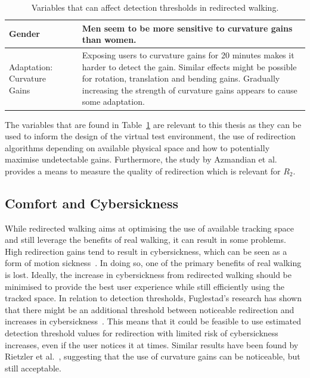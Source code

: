 \begin{table}[!h]
\begin{tabularx}{\textwidth}{|m{2cm}|m{1.7cm}|m{10.1cm}|}
\hline
Gender & \cite{nguyen2018individual} & Men seem to be more sensitive to curvature gains than women.\\
\hline
Adaptation: Curvature Gains & \cite{5072212, bolling2019shrinking, grechkin2016revisiting} & Exposing users to curvature gains for 20 minutes makes it harder to detect the gain. Similar effects might be possible for rotation, translation and bending gains. Gradually increasing the strength of curvature gains appears to cause some adaptation.\\
\hline
\end{tabularx}
\caption[Variables That Can Affect Detection Thresholds in Redirected Walking]{Variables that can affect detection thresholds in redirected walking.}
\label{table:DTVariables}
\end{table}

The variables that are found in Table~\ref{table:DTVariables} are relevant to this thesis as they can be used to inform the design of the virtual test environment, the use of redirection algorithms depending on available physical space and how to potentially maximise undetectable gains. Furthermore, the study by Azmandian et al.~\cite{azmandian2015physical} provides a means to measure the quality of redirection which is relevant for $R_2$.

\subsection{Comfort and Cybersickness}
While redirected walking aims at optimising the use of available tracking space and still leverage the benefits of real walking, it can result in some problems. High redirection gains tend to result in cybersickness, which can be seen as a form of motion sickness~\cite{mousavi2013review}. In doing so, one of the primary benefits of real walking is lost. Ideally, the increase in cybersickness from redirected walking should be minimised to provide the best user experience while still efficiently using the tracked space. In relation to detection thresholds, Fuglestad's research has shown that there might be an additional threshold between noticeable redirection and increases in cybersickness~\cite{fuglestad2018redirected}. This means that it could be feasible to use estimated detection threshold values for redirection with limited risk of cybersickness increases, even if the user notices it at times. Similar results have been found by Rietzler et al.~\cite{rietzler2018rethinking}, suggesting that the use of curvature gains can be noticeable, but still acceptable. 

